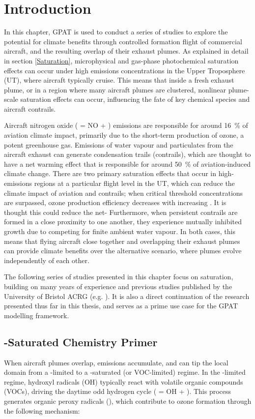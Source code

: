 \section{Introduction}
In this chapter, GPAT is used to conduct a series of studies to explore the potential for climate benefits through controlled formation flight of commercial aircraft, and the resulting overlap of their exhaust plumes. As explained in detail in section \ref{Saturation}, microphysical and gas-phase photochemical saturation effects can occur under high emissions concentrations in the Upper Troposphere (UT), where aircraft typically cruise. This means that inside a fresh exhaust plume, or in a region where many aircraft plumes are clustered, nonlinear plume-scale saturation effects can occur, influencing the fate of key chemical species and aircraft contrails. 

Aircraft nitrogen oxide ( = NO + ) emissions are responsible for around 16~\% of aviation climate impact, primarily due to the short-term production of ozone, a potent greenhouse gas. Emissions of water vapour and particulates from the aircraft exhaust can generate condensation trails (contrails), which are thought to have a net warming effect that is responsible for around 50~\% of aviation-induced climate change. There are two primary saturation effects that occur in high-emissions regions at a particular flight level in the UT, which can reduce the climate impact of aviation  and contrails; when critical  threshold concentrations are surpassed, ozone production efficiency decreases with increasing . It is thought this could reduce the net-  Furthermore, when persistent contrails are formed in a close proximity to one another, they experience mutually inhibited growth due to competing for finite ambient water vapour. In both cases, this means that flying aircraft close together and overlapping their exhaust plumes can provide climate benefits over the alternative scenario, where plumes evolve independently of each other.

The following series of studies presented in this chapter focus on  saturation, building on many years of experience and previous studies published by the University of Bristol ACRG (e.g. \cite{Derwent2024}). It is also a direct continuation of the research presented thus far in this thesis, and serves as a prime use case for the GPAT modelling framework.

\subsection{-Saturated Chemistry Primer}
When aircraft plumes overlap,  emissions accumulate, and can tip the local domain from a -limited to a -saturated (or VOC-limited) regime. In the -limited regime, hydroxyl radicals (OH) typically react with volatile organic compounds (VOCs), driving the daytime odd hydrogen cycle ( = OH + ). This process generates organic peroxy radicals (), which contribute to ozone formation through the following mechanism:


